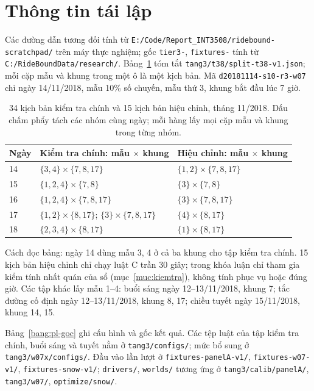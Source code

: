 \section{Thông tin tái lập}
\label{phuluc:C}
\setcounter{table}{0}

Các đường dẫn tương đối tính từ \nolinkurl{E:/Code/Report_INT3508/ridebound-scratchpad/} trên máy thực nghiệm; gốc \texttt{tier3-}, \texttt{fixtures-} tính từ \nolinkurl{C:/RideBoundData/research/}. Bảng~\ref{bang:pl-danhsach} tóm tắt \nolinkurl{tang3/t38/split-t38-v1.json}; mỗi cặp mẫu và khung trong một ô là một kịch bản. Mã \nolinkurl{d20181114-s10-r3-w07} chỉ ngày 14/11/2018, mẫu 10\% số chuyến, mẫu thứ 3, khung bắt đầu lúc 7 giờ.

\begin{table}[htbp]
\centering
\caption{34 kịch bản kiểm tra chính và 15 kịch bản hiệu chỉnh, tháng 11/2018. Dấu chấm phẩy tách các nhóm cùng ngày; mỗi hàng lấy mọi cặp mẫu và khung trong từng nhóm.}
\label{bang:pl-danhsach}
\begin{tabular}{@{}p{1.5cm}p{6.8cm}p{6.5cm}@{}}
\toprule
\textbf{Ngày} & \textbf{Kiểm tra chính: mẫu $\times$ khung} & \textbf{Hiệu chỉnh: mẫu $\times$ khung} \\
\midrule
14 & $\{3,4\}\times\{7,8,17\}$ & $\{1,2\}\times\{7,8,17\}$ \\
15 & $\{1,2,4\}\times\{7,8\}$ & $\{3\}\times\{7,8\}$ \\
16 & $\{1,2,4\}\times\{7,8,17\}$ & $\{3\}\times\{7,8,17\}$ \\
17 & $\{1,2\}\times\{8,17\}$; $\{3\}\times\{7,8,17\}$ & $\{4\}\times\{8,17\}$ \\
18 & $\{2,3,4\}\times\{8,17\}$ & $\{1\}\times\{8,17\}$ \\
\bottomrule
\end{tabular}
\end{table}

Cách đọc bảng: ngày 14 dùng mẫu 3, 4 ở cả ba khung cho tập kiểm tra chính. 15 kịch bản hiệu chỉnh chỉ chạy luật C trần 30 giây; trong khóa luận chỉ tham gia kiểm tính nhất quán của sổ (mục~\ref{muc:kiemtra}), không tính phục vụ hoặc đúng giờ. Các tập khác lấy mẫu 1--4: buổi sáng ngày 12--13/11/2018, khung 7; tắc đường cố định ngày 12--13/11/2018, khung 8, 17; chiều tuyết ngày 15/11/2018, khung 14, 15.

Bảng~\ref{bang:pl-goc} ghi cấu hình và gốc kết quả. Các tệp luật của tập kiểm tra chính, buổi sáng và tuyết nằm ở \nolinkurl{tang3/configs/}; mức bổ sung ở \nolinkurl{tang3/w07x/configs/}. Đầu vào lần lượt ở \nolinkurl{fixtures-panelA-v1/}, \nolinkurl{fixtures-w07-v1/}, \nolinkurl{fixtures-snow-v1/}; \nolinkurl{drivers/}, \nolinkurl{worlds/} tương ứng ở \nolinkurl{tang3/calib/panelA/}, \nolinkurl{tang3/w07/}, \nolinkurl{optimize/snow/}.

